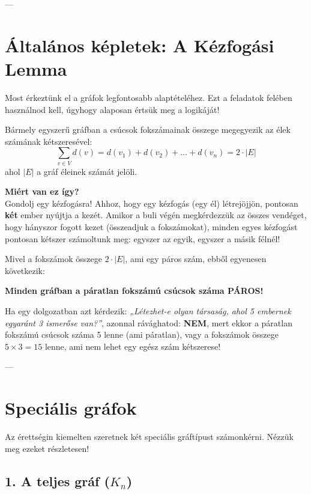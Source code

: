 \documentclass[a4paper,12pt]{article}
\newcommand{\textbfr}[1]{\textbf{\textcolor{bvred}{#1}}} %
\theoremstyle{definition} %
\begin{document}
---

\section{Általános képletek: A Kézfogási Lemma}

Most érkeztünk el a gráfok legfontosabb alaptételéhez. Ezt a feladatok felében használnod kell, úgyhogy alaposan értsük meg a logikáját!

\begin{teteldoboz}
Bármely egyszerű gráfban a csúcsok fokszámainak összege megegyezik az élek számának kétszeresével:
\begin{equation}
    \sum_{v \in V} d(v) = d(v_1) + d(v_2) + \dots + d(v_n) = 2 \cdot |E|
\end{equation}
ahol $|E|$ a gráf éleinek számát jelöli.
\end{teteldoboz}

\textbf{Miért van ez így?}\\
Gondolj egy kézfogásra! Ahhoz, hogy egy kézfogás (egy él) létrejöjjön, pontosan \textbf{két} ember nyújtja a kezét. Amikor a buli végén megkérdezzük az összes vendéget, hogy hányszor fogott kezet (összeadjuk a fokszámokat), minden egyes kézfogást pontosan kétszer számoltunk meg: egyszer az egyik, egyszer a másik félnél!

\begin{tippdoboz}
Mivel a fokszámok összege $2 \cdot |E|$, ami egy páros szám, ebből egyenesen következik:
\begin{center}
    \textbfr{Minden gráfban a páratlan fokszámú csúcsok száma PÁROS!}
\end{center}
Ha egy dolgozatban azt kérdezik: \textit{„Létezhet-e olyan társaság, ahol 5 embernek egyaránt 3 ismerőse van?”}, azonnal rávághatod: \textbf{NEM}, mert ekkor a páratlan fokszámú csúcsok száma 5 lenne (ami páratlan), vagy a fokszámok összege $5 \times 3 = 15$ lenne, ami nem lehet egy egész szám kétszerese!
\end{tippdoboz}

---

\section{Speciális gráfok}

Az érettségin kiemelten szeretnek két speciális gráftípust számonkérni. Nézzük meg ezeket részletesen!

\subsection{1. A teljes gráf ($K_n$)}
\end{document}
